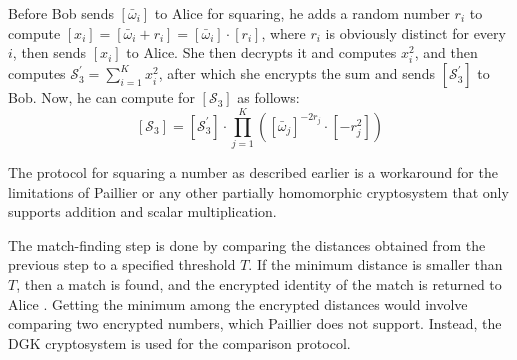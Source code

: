 Before Bob sends $\left[\bar{\omega}_i\right]$ to Alice for squaring, he adds a random number $r_i$ to compute $\left[x_i\right] = \left[\bar{\omega}_i + r_i\right] = \left[\bar{\omega}_i\right] \cdot \left[r_i\right]$, where $r_i$ is obviously distinct for every $i$, then sends $\left[x_i\right]$ to Alice. She then decrypts it and computes $x_i^2$, and then computes $\mathcal{S}_3^\prime = \sum_{i=1}^{K} x_i^2$, after which she encrypts the sum and sends $\left[\mathcal{S}_3^\prime\right]$ to Bob. Now, he can compute for $\left[\mathcal{S}_3\right]$ as follows:
\begin{equation}
	\left[\mathcal{S}_3\right] = \left[\mathcal{S}_3^\prime\right] \cdot \prod_{j=1}^{K} \left(\left[\bar{\omega}_j\right]^{-2r_j} \cdot \left[-r_j^2\right]\right)
\end{equation}

The protocol for squaring a number as described earlier is a workaround for the limitations of Paillier or any other partially homomorphic cryptosystem that only supports addition and scalar multiplication.

The match-finding step is done by comparing the distances obtained from the previous step to a specified threshold $T$. If the minimum distance is smaller than $T$, then a match is found, and the encrypted identity of the match is returned to Alice \cite{hutchison_privacy-preserving_2009}. Getting the minimum among the encrypted distances would involve comparing two encrypted numbers, which Paillier does not support. Instead, the DGK cryptosystem \cite{pieprzyk_efficient_2007} is used for the comparison protocol.
